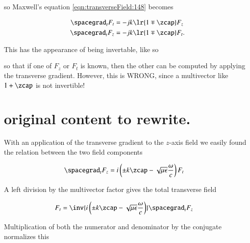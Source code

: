 so Maxwell's equation \cref{eqn:transverseField:148} becomes

\begin{dmath}\label{eqn:transverseField:228}
\begin{aligned}
\spacegrad_t F_t &= - j k \lr{ 1 \mp \zcap } F_z \\
\spacegrad_t F_z &= - j k \lr{ 1 \mp \zcap } F_t.
\end{aligned}
\end{dmath}

This has the appearance of being invertable, like so


so that if one of \( F_z \) or \( F_t \) is known, then the other can be computed by applying the transverse gradient.  However, this is WRONG, since a multivector like \( 1 + \zcap \) is not invertible!

\section{original content to rewrite.}

With an application of the transverse gradient to the \(z\)-axis field we easily found the relation between the two field components

\begin{equation}\label{eqn:transverseField:6}
\begin{aligned}
\spacegrad_t F_z &= i \left( \pm k \zcap - \sqrt{\mu\epsilon}\frac{\omega}{c}\right) F_t
\end{aligned}
\end{equation}

A left division by the multivector factor gives the total transverse field

\begin{equation}\label{eqn:transverseField:7}
\begin{aligned}
F_t &= \inv{i \left( \pm k \zcap - \sqrt{\mu\epsilon}\frac{\omega}{c}\right) } \spacegrad_t F_z
\end{aligned}
\end{equation}

Multiplication of both the numerator and denominator by the conjugate normalizes this

